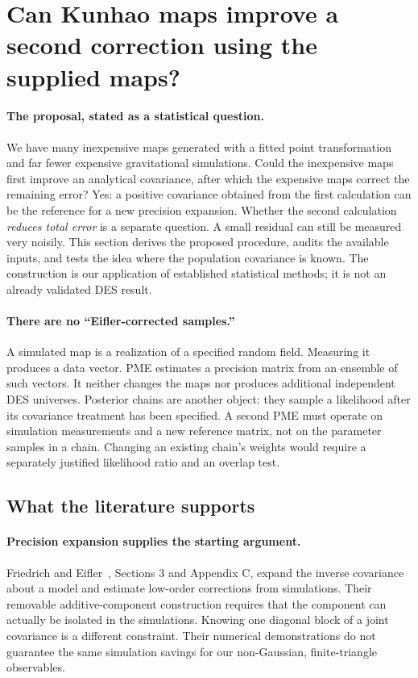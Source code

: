 \documentclass[11pt]{article}
\begin{document}


\clearpage
\section{Can Kunhao maps improve a second correction using the supplied maps?}
\label{sec:two-stage-pme}

\paragraph{The proposal, stated as a statistical question.}
We have many inexpensive maps generated with a fitted point transformation
and far fewer expensive gravitational simulations. Could the inexpensive
maps first improve an analytical covariance, after which the expensive maps
correct the remaining error? Yes: a positive covariance obtained from the
first calculation can be the reference for a new precision expansion.
Whether the second calculation \emph{reduces total error} is a separate
question. A small residual can still be measured very noisily. This section
derives the proposed procedure, audits the available inputs, and tests the
idea where the population covariance is known. The construction is our
application of established statistical methods; it is not an already
validated DES result.

\paragraph{There are no ``Eifler-corrected samples.''}
A simulated map is a realization of a specified random field. Measuring it
produces a data vector. PME estimates a precision matrix from an ensemble
of such vectors. It neither changes the maps nor produces additional
independent DES universes. Posterior chains are another object: they sample
a likelihood after its covariance treatment has been specified. A second
PME must operate on simulation measurements and a new reference matrix,
not on the parameter samples in a chain. Changing an existing chain's
weights would require a separately justified likelihood ratio and an
overlap test.

\subsection{What the literature supports}

\paragraph{Precision expansion supplies the starting argument.}
Friedrich and Eifler~\cite{pme}, Sections 3 and Appendix C, expand the
inverse covariance about a model and estimate low-order corrections from
simulations. Their removable additive-component construction requires that
the component can actually be isolated in the simulations. Knowing one
diagonal block of a joint covariance is a different constraint. Their
numerical demonstrations do not guarantee the same simulation savings for
our non-Gaussian, finite-triangle observables.
\end{document}
